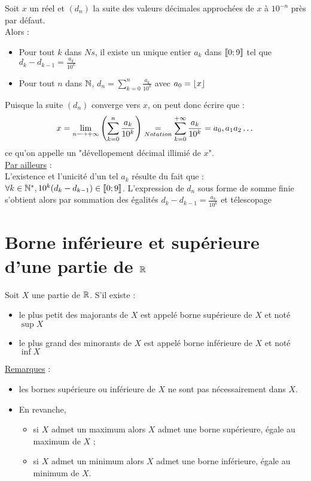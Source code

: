 \begin{defprop}
    Soit \(x\) un réel et \((d_n)\) la suite des valeurs décimales approchées de \(x\) à \(10^{-n}\) près par défaut. \\
    Alors :
    \begin{itemize}
        \item Pour tout \(k\) dans \(Ns\), il existe un unique entier \(a_k\) dans \(\left\llbracket0;9\right\rrbracket \) tel que \(d_k-d_{k-1} = \frac{a_k}{10^k}\) \\
        \item Pour tout \(n\) dans \(\mathbb{N}\), \(d_n = \sum_{k=0}^{n} \frac{a_k}{10^k}\) avec \(a_0 = \left\lfloor x\right\rfloor\)
    \end{itemize}
    Puisque la suite \((d_n)\) converge vers \(x\), on peut donc écrire que :   
    \[x = \lim_{n\longrightarrow+\infty} \left(\sum_{k=0}^{n} \frac{a_k}{10^k}\right) \underset{Notation}{=} \sum_{k=0}^{+\infty} \frac{a_k}{10^k} = a_0,a_1a_2\dots\]
    ce qu'on appelle un "dévellopement décimal illimié de \(x\)". \\
    \underline{Par ailleurs} : \\
    L’existence et l’unicité d’un tel \(a_k\) résulte du fait que : \(\forall k \in \mathbb{N}^*, 10^k (d_k - d_{k-1}) \in \left\llbracket0;9\right\rrbracket\). L’expression de \(d_n\) sous forme de somme finie s’obtient alors par sommation des égalités \(d_k - d_{k-1} =\frac{a_k}{10^k} \) et télescopage
\end{defprop}

\section{Borne inférieure et supérieure d'une partie de \(\mathbb{R}\)}

\begin{defi}
    Soit \(X\) une partie de \(\mathbb{R}\). S'il existe :
    \begin{itemize}
        \item le plus petit des majorants de \(X\) est appelé borne supérieure de \(X\) et noté \(\sup X\)
        \item le plus grand des minorants de \(X\) est appelé borne inférieure de \(X\) et noté \(\inf X\)
    \end{itemize}
    \underline{Remarques} : \\
    \begin{itemize}
        \item les bornes supérieure ou inférieure de \(X\) ne sont pas nécessairement dans \(X\).
        \item En revanche,
        \begin{itemize}
            \item si \(X\) admet un maximum alors \(X\) admet une borne supérieure, égale au maximum de \(X\) ;
            \item si \(X\) admet un minimum alors \(X\) admet une borne inférieure, égale au minimum de \(X\).
        \end{itemize}

    \end{itemize}
\end{defi}

